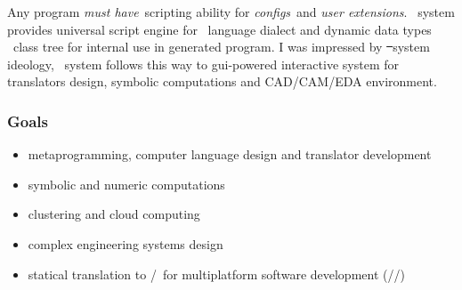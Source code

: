 
Any program \emph{must have}\ scripting ability for \emph{configs}\ and 
\emph{user extensions}. \bi\ system provides universal script engine for
\bi\ language dialect and dynamic data types \cpp\ class tree
for internal use in generated program.
I was impressed by \st\ system ideology, \bi\ system follows this way to
gui-powered interactive system for translators design, symbolic computations and
CAD/CAM/EDA environment.

\subsubsection{Goals}

\begin{itemize}[nosep]
\item metaprogramming, computer language design and translator development
\item symbolic and numeric computations
\item clustering and cloud computing
\item complex engineering systems design
\item statical translation to \cpp/\java\ for multiplatform software development
(\win/\lin/\andr) 
\end{itemize}